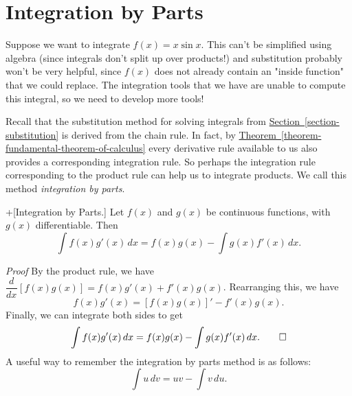 \documentclass[10pt,]{book}
\makeatletter
\theoremstyle{ptxplainnotitle}
\theoremstyle{ptxplaintitle}
\theoremstyle{ptxplainnotitle}
\theoremstyle{ptxplaintitle}
\theoremstyle{ptxplainnotitle}
\theoremstyle{ptxplaintitle}
\renewcommand*{\proofname}{Proof}
\renewenvironment{proof}[1][\proofname]{\par
  \pushQED{\qed}%
  \normalfont \topsep6\p@\@plus6\p@\relax
  \trivlist
  \item\relax
    {\itshape
    #1\@addpunct{.}}\hspace\labelsep\ignorespaces
}{%
  \popQED\endtrivlist\@endpefalse
}
\theoremstyle{ptxdefinitionnotitle}
\theoremstyle{ptxdefinitiontitle}
\theoremstyle{ptxdefinitionnotitle}
\theoremstyle{ptxdefinitiontitle}
\theoremstyle{ptxdefinitionnotitle}
\theoremstyle{ptxdefinitiontitle}
\theoremstyle{ptxdefinitionnotitle}
\theoremstyle{ptxdefinitiontitle}
\theoremstyle{ptxdefinitionnotitle}
\theoremstyle{ptxdefinitiontitle}
\numberwithin{equation}{section}
\newcommand{\dv}[3][]{\dfrac{d^{#1} #2}{d #3^{#1}}}
\makeatother
\begin{document}
\section[{Integration by Parts}]{Integration by Parts}\label{section-integration-by-parts}
\hypertarget{p-495}{}%
Suppose we want to integrate \(f(x) = x\sin x\). This can't be simplified using algebra (since integrals don't split up over products!) and substitution probably won't be very helpful, since \(f(x)\) does not already contain an "inside function" that we could replace. The integration tools that we have are unable to compute this integral, so we need to develop more tools!%
\par
\hypertarget{p-496}{}%
Recall that the substitution method for solving integrals from \hyperref[section-substitution]{Section~\ref{section-substitution}} is derived from the chain rule. In fact, by \hyperref[theorem-fundamental-theorem-of-calculus]{Theorem~\ref{theorem-fundamental-theorem-of-calculus}} every derivative rule available to us also provides a corresponding integration rule. So perhaps the integration rule corresponding to the product rule can help us to integrate products. We call this method \emph{integration by parts}.%
\begin{theorem}+[{Integration by Parts.}]\label{theorem-integration-by-parts}
\hypertarget{p-497}{}%
Let \(f(x)\) and \(g(x)\) be continuous functions, with \(g(x)\) differentiable. Then%
%
\begin{equation*}
\int f(x)g'(x)\,dx = f(x)g(x) - \int g(x)f'(x)\,dx.
\end{equation*}
\end{theorem}
\begin{proof}\hypertarget{proof-12}{}
\hypertarget{p-498}{}%
By the product rule, we have \(\dv{}{x}[f(x)g(x)] = f(x)g'(x) + f'(x)g(x)\). Rearranging this, we have%
\begin{equation*}
f(x)g'(x) = [f(x)g(x)]' - f'(x)g(x).
\end{equation*}
Finally, we can integrate both sides to get%
\begin{equation*}
\int f(x)g'(x)\,dx = f(x)g(x) - \int g(x)f'(x)\,dx.\qedhere
\end{equation*}
%
\end{proof}
\hypertarget{p-499}{}%
A useful way to remember the integration by parts method is as follows:%
\begin{equation}
\int u\,dv = uv - \int v\,du.\label{equation-integration-by-parts}
\end{equation}
\end{document}
